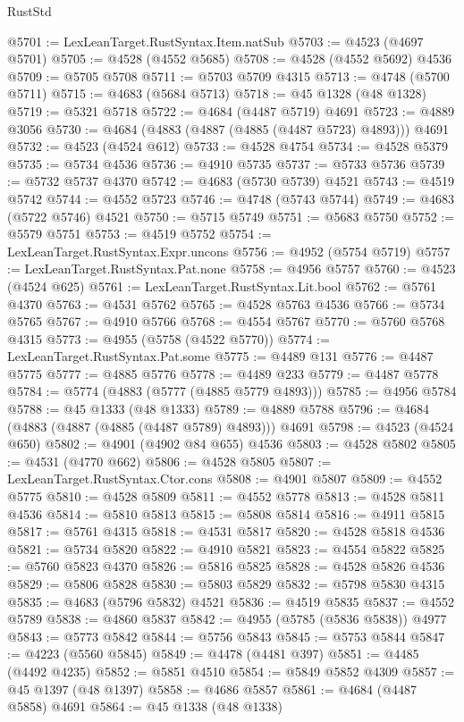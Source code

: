 \begin{lexlean}{RustStd}
\begin{coremodule}
@5701 := LexLeanTarget.RustSyntax.Item.natSub
@5703 := @4523 (@4697 @5701)
@5705 := @4528 (@4552 @5685)
@5708 := @4528 (@4552 @5692) @4536
@5709 := @5705 @5708
@5711 := @5703 @5709 @4315
@5713 := @4748 (@5700 @5711)
@5715 := @4683 (@5684 @5713)
@5718 := @45 @1328 (@48 @1328)
@5719 := @5321 @5718
@5722 := @4684 (@4487 @5719) @4691
@5723 := @4889 @3056
@5730 := @4684 (@4883 (@4887 (@4885 (@4487 @5723) @4893))) @4691
@5732 := @4523 (@4524 @612)
@5733 := @4528 @4754
@5734 := @4528 @5379
@5735 := @5734 @4536
@5736 := @4910 @5735
@5737 := @5733 @5736
@5739 := @5732 @5737 @4370
@5742 := @4683 (@5730 @5739) @4521
@5743 := @4519 @5742
@5744 := @4552 @5723
@5746 := @4748 (@5743 @5744)
@5749 := @4683 (@5722 @5746) @4521
@5750 := @5715 @5749
@5751 := @5683 @5750
@5752 := @5579 @5751
@5753 := @4519 @5752
@5754 := LexLeanTarget.RustSyntax.Expr.uncons
@5756 := @4952 (@5754 @5719)
@5757 := LexLeanTarget.RustSyntax.Pat.none
@5758 := @4956 @5757
@5760 := @4523 (@4524 @625)
@5761 := LexLeanTarget.RustSyntax.Lit.bool
@5762 := @5761 @4370
@5763 := @4531 @5762
@5765 := @4528 @5763 @4536
@5766 := @5734 @5765
@5767 := @4910 @5766
@5768 := @4554 @5767
@5770 := @5760 @5768 @4315
@5773 := @4955 (@5758 (@4522 @5770))
@5774 := LexLeanTarget.RustSyntax.Pat.some
@5775 := @4489 @131
@5776 := @4487 @5775
@5777 := @4885 @5776
@5778 := @4489 @233
@5779 := @4487 @5778
@5784 := @5774 (@4883 (@5777 (@4885 @5779 @4893)))
@5785 := @4956 @5784
@5788 := @45 @1333 (@48 @1333)
@5789 := @4889 @5788
@5796 := @4684 (@4883 (@4887 (@4885 (@4487 @5789) @4893))) @4691
@5798 := @4523 (@4524 @650)
@5802 := @4901 (@4902 @84 @655) @4536
@5803 := @4528 @5802
@5805 := @4531 (@4770 @662)
@5806 := @4528 @5805
@5807 := LexLeanTarget.RustSyntax.Ctor.cons
@5808 := @4901 @5807
@5809 := @4552 @5775
@5810 := @4528 @5809
@5811 := @4552 @5778
@5813 := @4528 @5811 @4536
@5814 := @5810 @5813
@5815 := @5808 @5814
@5816 := @4911 @5815
@5817 := @5761 @4315
@5818 := @4531 @5817
@5820 := @4528 @5818 @4536
@5821 := @5734 @5820
@5822 := @4910 @5821
@5823 := @4554 @5822
@5825 := @5760 @5823 @4370
@5826 := @5816 @5825
@5828 := @4528 @5826 @4536
@5829 := @5806 @5828
@5830 := @5803 @5829
@5832 := @5798 @5830 @4315
@5835 := @4683 (@5796 @5832) @4521
@5836 := @4519 @5835
@5837 := @4552 @5789
@5838 := @4860 @5837
@5842 := @4955 (@5785 (@5836 @5838)) @4977
@5843 := @5773 @5842
@5844 := @5756 @5843
@5845 := @5753 @5844
@5847 := @4223 (@5560 @5845)
@5849 := @4478 (@4481 @397)
@5851 := @4485 (@4492 @4235)
@5852 := @5851 @4510
@5854 := @5849 @5852 @4309
@5857 := @45 @1397 (@48 @1397)
@5858 := @4686 @5857
@5861 := @4684 (@4487 @5858) @4691
@5864 := @45 @1338 (@48 @1338)

\end{coremodule}
\end{lexlean}

